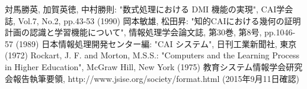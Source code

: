 \documentclass{ltjarticle}
\begin{document}
\begin{thebibliography}{5}
  対馬勝英, 加賀英徳, 中村勝則: "数式処理における DMI 機能の実現", CAI学会誌, Vol.7, No.2, pp.43-53 (1990)
  岡本敏雄, 松田昇: "知的CAIにおける幾何の証明計画の認識と学習機能について", 情報処理学会論文誌, 第30巻, 第8号, pp.1046-57 (1989)
  日本情報処理開発センター編: "CAI システム", 日刊工業新聞社, 東京 (1972)
  Rockart, J. F. and Morton, M.S.S.: "Computers and the Learning Process in Higher Education", McGraw Hill, New York (1975)
  教育システム情報学会研究会報告執筆要領,
  http://www.jsise.org/society/format.html (2015年9月11日確認)
\end{thebibliography}
\end{document}
